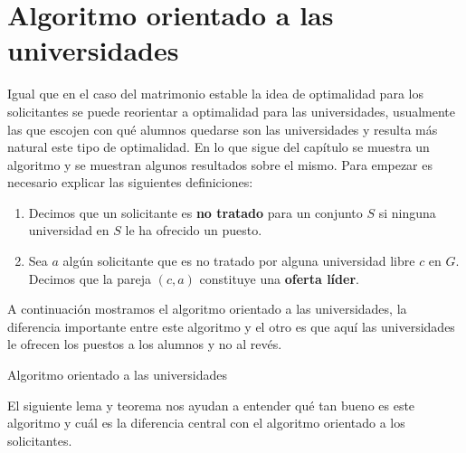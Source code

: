 \section{Algoritmo orientado a las universidades}

Igual que en el caso del matrimonio estable la idea de optimalidad para los solicitantes se puede reorientar a optimalidad para las universidades, usualmente las que escojen con qué alumnos quedarse son las universidades y resulta más natural este tipo de optimalidad. En lo que sigue del capítulo se muestra un algoritmo y se muestran algunos resultados sobre el mismo. Para empezar es necesario explicar las siguientes definiciones:
\begin{enumerate}
\item Decimos que un solicitante es \textbf{no tratado} para un conjunto $S$ si ninguna universidad en $S$ le ha ofrecido un puesto.
\item Sea $a$ algún solicitante que es no tratado por alguna universidad libre $c$ en $G$. Decimos que la pareja $(c,a)$ constituye una \textbf{oferta líder}.
\end{enumerate}

A continuación mostramos el algoritmo orientado a las universidades, la diferencia importante entre este algoritmo y el otro es que aquí las universidades le ofrecen los puestos a los alumnos y no al revés.

\IncMargin{1em}
\begin{Algoritmo}[H]

\BlankLine
{}
\caption{Algoritmo orientado a las universidades}
\end{Algoritmo}
\DecMargin{1em}

El siguiente lema y teorema nos ayudan a entender qué tan bueno es este algoritmo y cuál es la diferencia central con el algoritmo orientado a los solicitantes. 


